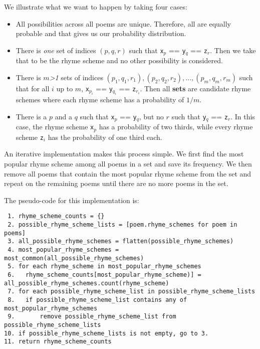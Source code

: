 We illustrate what we want to happen by taking four cases:
\begin{itemize}
\item{All possibilities across all poems are unique. Therefore, all are equally probable and that gives us our probability distribution.}
\item{There is \textit{one} set of indices $(p, q, r)$ such that \texttt{x$_p$} == \texttt{y$_q$} == \texttt{z$_r$}. Then we take that to be the rhyme scheme and no other possibility is considered.}
\item{There is $m$\textit{\textgreater 1} sets of indices $(p_1, q_1, r_1), (p_2, q_2, r_2), ..., (p_m, q_m, r_m)$ such that for all $i$ up to $m$, \texttt{x$_{p_i}$} == \texttt{y$_{q_i}$} == \texttt{z$_{r_i}$}. Then all \textbf{sets} are candidate rhyme schemes where each rhyme scheme has a probability of $1/m$.}
\item{There is a $p$ and a $q$ such that \texttt{x$_p$} == \texttt{y$_q$}, but no $r$ such that \texttt{y$_q$} == \texttt{z$_r$}. In this case, the rhyme scheme \texttt{x$_p$} has a probability of two thirds, while every rhyme scheme \texttt{z$_i$} has the probability of one third each.}
\end{itemize}

An iterative implementation makes this process simple. We first find the most popular rhyme scheme among all poems in a set and save its frequency. We then remove all poems that contain the most popular rhyme scheme from the set and repeat on the remaining poems until there are no more poems in the set. 

The pseudo-code for this implementation is:

\begin{verbatim}
 1. rhyme_scheme_counts = {}
 2. possible_rhyme_scheme_lists = [poem.rhyme_schemes for poem in poems]
 3. all_possible_rhyme_schemes = flatten(possible_rhyme_schemes)	
 4. most_popular_rhyme_schemes = most_common(all_possible_rhyme_schemes)
 5. for each rhyme_scheme in most_popular_rhyme_schemes
 6.   rhyme_scheme_counts[most_popular_rhyme_scheme)] = all_possible_rhyme_schemes.count(rhyme_scheme)
 7. for each possible_rhyme_scheme_list in possible_rhyme_scheme_lists
 8.	  if possible_rhyme_scheme_list contains any of  most_popular_rhyme_schemes
 9.		  remove possible_rhyme_scheme_list from possible_rhyme_scheme_lists
10. if possible_rhyme_scheme_lists is not empty, go to 3.
11. return rhyme_scheme_counts
\end{verbatim}

